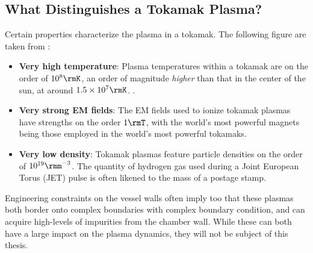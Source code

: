 \subsection*{What Distinguishes a Tokamak Plasma?}
    Certain properties characterize the plasma in a tokamak. The following figure are taken from \cite{Wes00}:
    \begin{itemize}
        \item  {\bf Very high temperature}: Plasma temperatures within a tokamak are on the order of $10^{8}\rmK$, an order of magnitude \emph{higher} than that in the center of the sun, at around $1.5\times10^{7}\rmK$. \BA{[Ref]}.
        \item  {\bf Very strong EM fields}: The EM fields used to ionize tokamak plasmas have strengths on the order $1\rmT$, with the world's most powerful magnets being those employed in the world's most powerful tokamaks. \BA{[Ref]}
        \item  {\bf Very low density}: Tokamak plasmas feature particle densities on the order of $10^{19}\rmm^{- 3}$. The quantity of hydrogen gas used during a Joint European Torus (JET) pulse is often likened to the mass of a postage stamp. \BA{[Ref]}
    \end{itemize}
    Engineering constraints on the vessel walls often imply too that these plasmas both border onto complex boundaries with complex boundary condition, and can acquire high-levels of impurities from the chamber wall. While these can both have a large impact on the plasma dynamics, they will not be subject of this thesis.
    